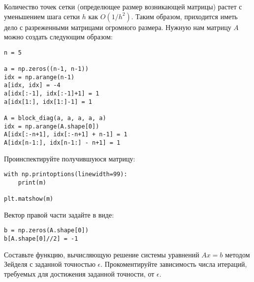 \documentclass[prb,papersize=a4paper,notitlepage]{revtex4-1}%
\begin{document}
\begin{enumerate}
Количество точек сетки (определющее размер возникающей матрицы) растет с уменьшением шага сетки $h$ как $O(1/h^2)$. Таким образом, приходится иметь дело с разреженными матрицами огромного размера. Нужную нам матрицу $A$ можно создать следующим образом:
\lstset{language=Python}
\lstset{frame=lines}
\lstset{basicstyle=\ttfamily}
\begin{lstlisting}
n = 5

a = np.zeros((n-1, n-1))
idx = np.arange(n-1)
a[idx, idx] = -4
a[idx[:-1], idx[:-1]+1] = 1
a[idx[1:], idx[1:]-1] = 1

A = block_diag(a, a, a, a, a)
idx = np.arange(A.shape[0])
A[idx[:-n+1], idx[:-n+1] + n-1] = 1
A[idx[n-1:], idx[n-1:] - n+1] = 1
\end{lstlisting}

Проинспектируйте получившуюся матрицу:
\lstset{language=Python}
\lstset{frame=lines}
\lstset{basicstyle=\ttfamily}
\begin{lstlisting}
with np.printoptions(linewidth=99):
    print(m)

plt.matshow(m)
\end{lstlisting}

Вектор правой части задайте в виде:
\lstset{language=Python}
\lstset{frame=lines}
\lstset{basicstyle=\ttfamily}
\begin{lstlisting}
b = np.zeros(A.shape[0])
b[A.shape[0]//2] = -1
\end{lstlisting}

Составьте функцию, вычисляющую решение системы уравнений $A x = b$ методом Зейделя с заданной точностью $\epsilon$. Прокоментируйте зависимость числа итераций, требуемых для достижения заданной точности, от $\epsilon$.

\end{enumerate} 
\end{document}
